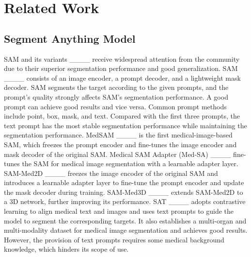 \section{Related Work}
\subsection{Segment Anything Model}
SAM and its variants ____ receive widespread attention from the community due to their superior segmentation performance and good generalization. SAM ____ consists of an image encoder, a prompt decoder, and a lightweight mask decoder. SAM segments the target according to the given prompts, and the prompt's quality strongly affects SAM's segmentation performance. A good prompt can achieve good results and vice versa. Common prompt methods include point, box, mask, and text. Compared with the first three prompts, the text prompt has the most stable segmentation performance while maintaining the segmentation performance. MedSAM ____ is the first medical-image-based SAM, which freezes the prompt encoder and fine-tunes the image encoder and mask decoder of the original SAM.
Medical SAM Adapter (Med-SA) ____ fine-tunes the SAM for medical image segmentation with a learnable adapter layer.
SAM-Med2D ____ freezes the image encoder of the original SAM and introduces a learnable adapter layer to fine-tune the prompt encoder and update the mask decoder during training. SAM-Med3D ____ extends SAM-Med2D to a 3D network, further improving its performance.
SAT ____ adopts contrastive learning to align medical text and images and uses text prompts to guide the model to segment the corresponding targets. It also establishes a multi-organ and multi-modality dataset for medical image segmentation and achieves good results. However, the provision of text prompts requires some medical background knowledge, which hinders its scope of use.

